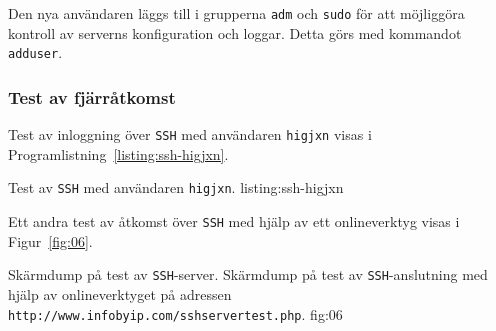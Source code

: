 Den nya användaren läggs till i grupperna \texttt{adm} och \texttt{sudo} för
att möjliggöra kontroll av serverns konfiguration och loggar. Detta görs med
kommandot \texttt{adduser}.


\subsubsection{Test av fjärråtkomst}
Test av inloggning över \texttt{SSH} med användaren \texttt{higjxn} visas i
Programlistning~\ref{listing:ssh-higjxn}.

            {Test av \texttt{SSH} med användaren \texttt{higjxn}.}
            {listing:ssh-higjxn}

Ett andra test av åtkomst över \texttt{SSH} med hjälp av ett onlineverktyg
\cite{ipv6:sshservertest} visas i Figur~\ref{fig:06}.

           {Skärmdump på test av \texttt{SSH}-server.}
           {Skärmdump på test av \texttt{SSH}-anslutning med hjälp av
            onlineverktyget på adressen
            \texttt{http://www.infobyip.com/sshservertest.php}.}
           {fig:06}


